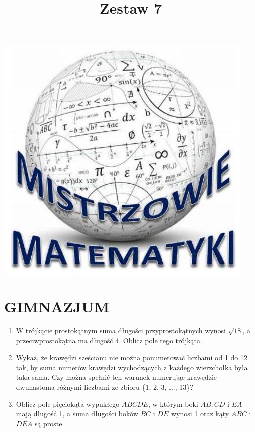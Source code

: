 \documentclass[10pt]{article}
\title{Zestaw 7 }
\author{}
\date{}
\begin{document}
\maketitle
\begin{center}
\includegraphics[max width=\textwidth]{2024_11_21_e31b2faaa846039f7212g-1}
\end{center}

\section*{GIMNAZJUM}
\begin{enumerate}
  \item W trójkącie prostokątnym suma długości przyprostokątnych wynosi \(\sqrt{18}\), a przeciwprostokątna ma długość 4. Oblicz pole tego trójkąta.
  \item Wykaż, że krawędzi sześcianu nie można ponumerować liczbami od 1 do 12 tak, by suma numerów krawędzi wychodzących z każdego wierzchołka była taka sama. Czy można spełnić ten warunek numerując krawędzie dwunastoma różnymi liczbami ze zbioru \{1, 2, 3, ..., 13\}?
  \item Oblicz pole pięciokąta wypukłego \(A B C D E\), w którym boki \(A B, C D\) i \(E A\) mają długość 1, a suma długości boków \(B C\) i \(D E\) wynosi 1 oraz kąty \(A B C\) i \(D E A\) są proste
\end{enumerate}
\end{document}
